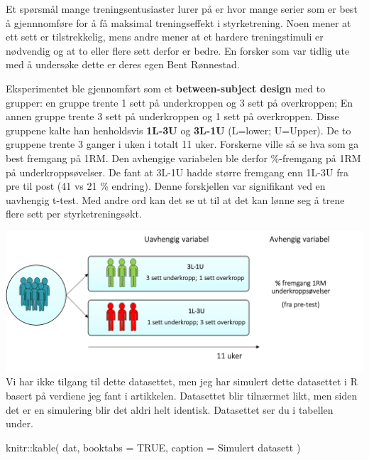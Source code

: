 \documentclass[
]{book}
\newenvironment{Shaded}{\begin{snugshade}}{\end{snugshade}}
\newcommand{\AttributeTok}[1]{\textcolor[rgb]{0.77,0.63,0.00}{#1}}
\newcommand{\ConstantTok}[1]{\textcolor[rgb]{0.00,0.00,0.00}{#1}}
\newcommand{\FunctionTok}[1]{\textcolor[rgb]{0.00,0.00,0.00}{#1}}
\newcommand{\NormalTok}[1]{#1}
\newcommand{\SpecialCharTok}[1]{\textcolor[rgb]{0.00,0.00,0.00}{#1}}
\newcommand{\StringTok}[1]{\textcolor[rgb]{0.31,0.60,0.02}{#1}}
\begin{document}
Et spørsmål mange treningsentusiaster lurer på er hvor mange serier som er best å gjennnomføre for å få maksimal treningseffekt i styrketrening. Noen mener at ett sett er tilstrekkelig, mens andre mener at et hardere treningstimuli er nødvendig og at to eller flere sett derfor er bedre. En forsker som var tidlig ute med å undersøke dette er deres egen Bent Rønnestad.

Eksperimentet ble gjennomført som et \textbf{between-subject design} med to grupper: en gruppe trente 1 sett på underkroppen og 3 sett på overkroppen; En annen gruppe trente 3 sett på underkroppen og 1 sett på overkroppen. Disse gruppene kalte han henholdsvis \textbf{1L-3U} og \textbf{3L-1U} (L=lower; U=Upper). De to gruppene trente 3 ganger i uken i totalt 11 uker. Forskerne ville så se hva som ga best fremgang på 1RM. Den avhengige variabelen ble derfor \%-fremgang på 1RM på underkroppsøvelser. De fant at 3L-1U hadde større fremgang enn 1L-3U fra pre til post (41 vs 21 \% endring). Denne forskjellen var signifikant ved en uavhengig t-test. Med andre ord kan det se ut til at det kan lønne seg å trene flere sett per styrketreningsøkt.

\includegraphics{design.png}
Vi har ikke tilgang til dette datasettet, men jeg har simulert dette datasettet i R basert på verdiene jeg fant i artikkelen. Datasettet blir tilnærmet likt, men siden det er en simulering blir det aldri helt identisk. Datasettet ser du i tabellen under.

\begin{Shaded}
\begin{Highlighting}[]
\NormalTok{knitr}\SpecialCharTok{::}\FunctionTok{kable}\NormalTok{(}
\NormalTok{  dat, }\AttributeTok{booktabs =} \ConstantTok{TRUE}\NormalTok{,}
  \AttributeTok{caption =} \StringTok{\textquotesingle{}Simulert datasett\textquotesingle{}}
\NormalTok{)}
\end{Highlighting}
\end{Shaded}
\end{document}
